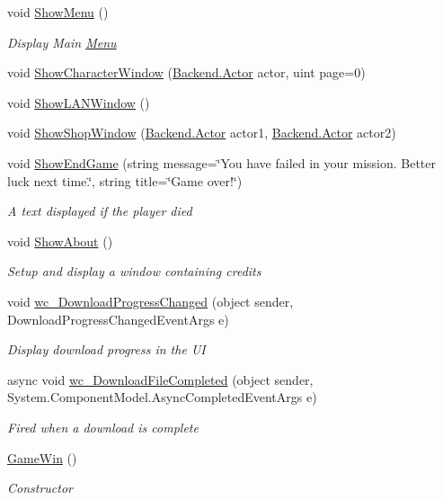 \begin{DoxyCompactItemize}
void \hyperlink{class_gruppe22_1_1_client_1_1_game_win_acfebdc3931812064384ddcdb3f8567fc}{Show\-Menu} ()
\begin{DoxyCompactList}\small\item\em Display Main \hyperlink{class_gruppe22_1_1_client_1_1_menu}{Menu} \end{DoxyCompactList}\item 
void \hyperlink{class_gruppe22_1_1_client_1_1_game_win_a2ed19ead3fd36339afba5e0ff77bc2df}{Show\-Character\-Window} (\hyperlink{class_gruppe22_1_1_backend_1_1_actor}{Backend.\-Actor} actor, uint page=0)
\item 
void \hyperlink{class_gruppe22_1_1_client_1_1_game_win_af4563aa3977fbf62693b4ecdc83c22f1}{Show\-L\-A\-N\-Window} ()
\item 
void \hyperlink{class_gruppe22_1_1_client_1_1_game_win_a2774c7e13e85ef3d970f8bdf263d2e82}{Show\-Shop\-Window} (\hyperlink{class_gruppe22_1_1_backend_1_1_actor}{Backend.\-Actor} actor1, \hyperlink{class_gruppe22_1_1_backend_1_1_actor}{Backend.\-Actor} actor2)
\item 
void \hyperlink{class_gruppe22_1_1_client_1_1_game_win_abc9e6c78b7d6e60781ab1c1af3df56ec}{Show\-End\-Game} (string message=\char`\"{}You have failed in your mission. Better luck next time.\char`\"{}, string title=\char`\"{}Game over!\char`\"{})
\begin{DoxyCompactList}\small\item\em A text displayed if the player died \end{DoxyCompactList}\item 
void \hyperlink{class_gruppe22_1_1_client_1_1_game_win_a4104fdcc750ee89cb2a5422c6a61fd46}{Show\-About} ()
\begin{DoxyCompactList}\small\item\em Setup and display a window containing credits \end{DoxyCompactList}\item 
void \hyperlink{class_gruppe22_1_1_client_1_1_game_win_a902806ea43082fb2b47cded624f2c8e8}{wc\-\_\-\-Download\-Progress\-Changed} (object sender, Download\-Progress\-Changed\-Event\-Args e)
\begin{DoxyCompactList}\small\item\em Display download progress in the U\-I \end{DoxyCompactList}\item 
async void \hyperlink{class_gruppe22_1_1_client_1_1_game_win_acf9aac2989d7c1c1f53fb747829565aa}{wc\-\_\-\-Download\-File\-Completed} (object sender, System.\-Component\-Model.\-Async\-Completed\-Event\-Args e)
\begin{DoxyCompactList}\small\item\em Fired when a download is complete \end{DoxyCompactList}\item 
\hyperlink{class_gruppe22_1_1_client_1_1_game_win_a9d15393eb228404a0ad0ec3494acd623}{Game\-Win} ()
\begin{DoxyCompactList}\small\item\em Constructor \end{DoxyCompactList}\end{DoxyCompactItemize}
